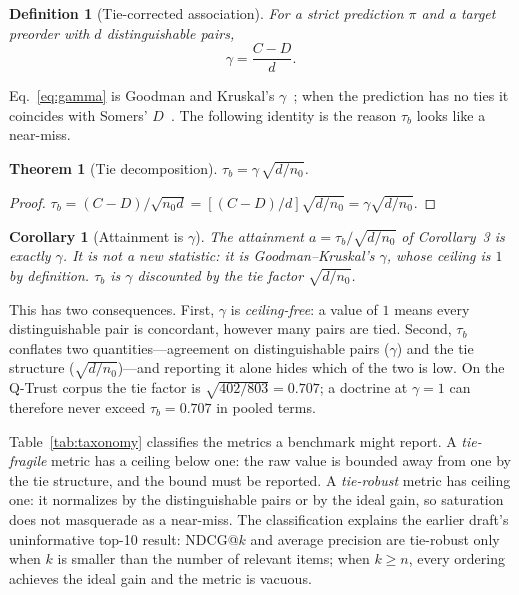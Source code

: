 \documentclass[conference,10pt]{IEEEtran}
\newtheorem{theorem}{Theorem}
\newtheorem{corollary}{Corollary}
\newtheorem{definition}{Definition}
\newcommand{\tb}{\tau_b}
\newcommand{\distinct}{d}
\newcommand{\nzero}{n_0}
\begin{document}
\begin{definition}[Tie-corrected association]
For a strict prediction $\pi$ and a target preorder with $\distinct$ distinguishable pairs,
\begin{equation}
\gamma=\frac{C-D}{\distinct}.
\label{eq:gamma}
\end{equation}
\end{definition}

Eq.~\eqref{eq:gamma} is Goodman and Kruskal's $\gamma$~\cite{goodman1954}; when the prediction
has no ties it coincides with Somers' $D$~\cite{somers1962}. The following identity is the
reason $\tb$ looks like a near-miss.

\begin{theorem}[Tie decomposition]
\label{thm:decomp}
$\tb = \gamma\,\sqrt{\distinct/\nzero}$.
\end{theorem}
\begin{proof}
$\tb=(C-D)/\sqrt{\nzero\distinct}=[(C-D)/\distinct]\sqrt{\distinct/\nzero}=\gamma\sqrt{\distinct/\nzero}$.
\end{proof}

\begin{corollary}[Attainment is $\gamma$]
The attainment $a=\tb/\sqrt{\distinct/\nzero}$ of Corollary~3 is exactly $\gamma$. It is not a
new statistic: it is Goodman--Kruskal's $\gamma$, whose ceiling is $1$ by definition. $\tb$ is
$\gamma$ discounted by the tie factor $\sqrt{\distinct/\nzero}$.
\end{corollary}

This has two consequences. First, $\gamma$ is \emph{ceiling-free}: a value of $1$ means every
distinguishable pair is concordant, however many pairs are tied. Second, $\tb$ conflates two
quantities---agreement on distinguishable pairs ($\gamma$) and the tie structure
($\sqrt{\distinct/\nzero}$)---and reporting it alone hides which of the two is low. On the
Q-Trust corpus the tie factor is $\sqrt{402/803}=0.707$; a doctrine at $\gamma=1$ can therefore
never exceed $\tb=0.707$ in pooled terms.

Table~\ref{tab:taxonomy} classifies the metrics a benchmark might report. A \emph{tie-fragile}
metric has a ceiling below one: the raw value is bounded away from one by the tie structure, and
the bound must be reported. A \emph{tie-robust} metric has ceiling one: it normalizes by the
distinguishable pairs or by the ideal gain, so saturation does not masquerade as a near-miss.
The classification explains the earlier draft's uninformative top-10 result: NDCG@$k$ and
average precision are tie-robust only when $k$ is smaller than the number of relevant items;
when $k\ge n$, every ordering achieves the ideal gain and the metric is vacuous.
\end{document}
